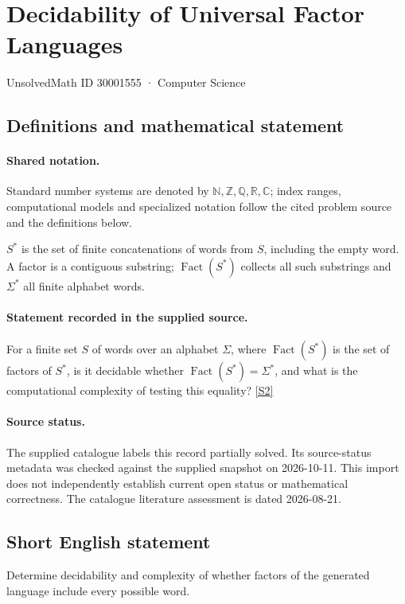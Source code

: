 \documentclass[11pt]{article}
\newcommand{\sref}[2]{\hyperlink{source:#1:#2}{[S#2]}}
\begin{document}
\setcounter{section}{30001554}
\section{Decidability of Universal Factor Languages}\label{30001555}
{\small\sffamily UnsolvedMath ID 30001555 · Computer Science}
\subsection{Definitions and mathematical statement}

\paragraph{Shared notation.}Standard number systems are denoted by $\mathbb N,\mathbb Z,\mathbb Q,\mathbb R,\mathbb C$; index ranges, computational models and specialized notation follow the cited problem source and the definitions below.


$S^*$ is the set of finite concatenations of words from $S$, including the empty word. A factor is a contiguous substring; $\operatorname{Fact}(S^*)$ collects all such substrings and $\Sigma^*$ all finite alphabet words.
\paragraph{Statement recorded in the supplied source.}
For a finite set $S$ of words over an alphabet $\Sigma$, where $\operatorname{Fact}(S^*)$ is the set of factors of $S^*$, is it decidable whether $\operatorname{Fact}(S^*)=\Sigma^*$, and what is the computational complexity of testing this equality? \sref{30001555}{2}
\paragraph{Source status.}
The supplied catalogue labels this record partially solved. Its source-status metadata was checked against the supplied snapshot on 2026-10-11. This import does not independently establish current open status or mathematical correctness. The catalogue literature assessment is dated 2026-08-21.
\subsection{Short English statement}
Determine decidability and complexity of whether factors of the generated language include every possible word.
\end{document}
